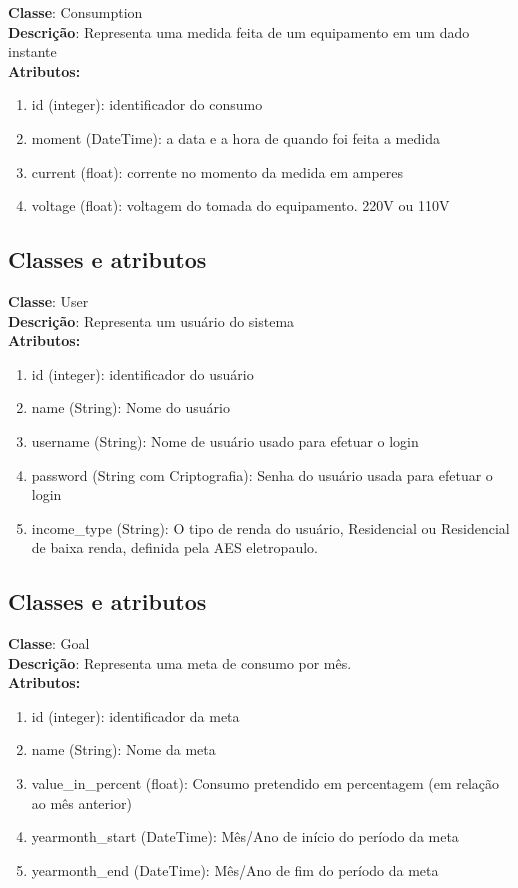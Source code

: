 \textbf{Classe}: Consumption\\
\textbf{Descrição}: Representa uma medida feita de um equipamento em um dado instante\\	
\textbf{Atributos:}
\begin{enumerate}
	\item id (integer): identificador do consumo
	\item moment (DateTime): a data e a hora de quando foi feita a medida
	\item current (float): corrente no momento da medida em amperes
	\item voltage (float): voltagem do tomada do equipamento. 220V ou 110V
\end{enumerate}

\subsection{Classes e atributos}
	\textbf{Classe}: User\\
	\textbf{Descrição}: Representa um usuário do sistema\\	
	\textbf{Atributos:}
\begin{enumerate}
	\item id (integer): identificador do usuário
	\item name (String):  Nome do usuário
	\item username (String): Nome de usuário usado para efetuar o login
	\item password (String com Criptografia): Senha do usuário usada para efetuar o login
    \item income\_type (String): O tipo de renda do usuário, Residencial ou Residencial de baixa renda, definida pela AES eletropaulo.
\end{enumerate}

\subsection{Classes e atributos}
	\textbf{Classe}: Goal\\
	\textbf{Descrição}: Representa uma meta de consumo por mês.\\
	\textbf{Atributos:}
\begin{enumerate}
	\item id (integer): identificador da meta
	\item name (String):  Nome da meta
	\item value\_in\_percent (float): Consumo pretendido em percentagem (em relação ao mês anterior)
	\item yearmonth\_start (DateTime): Mês/Ano de início do período da meta
    \item yearmonth\_end (DateTime): Mês/Ano de fim do período da meta
\end{enumerate}

